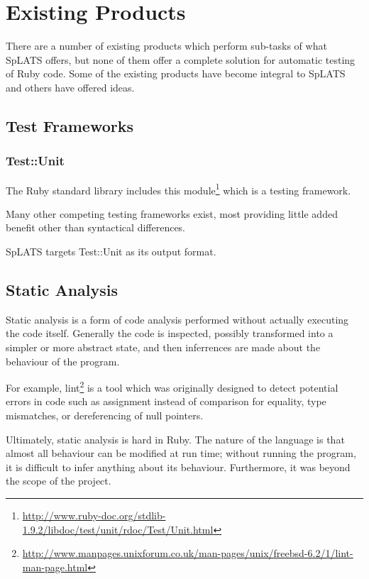 \chapter{Existing Products}

There are a number of existing products which perform sub-tasks of what SpLATS offers, but none of them offer a complete solution for automatic testing of Ruby code. Some of the existing products have become integral to SpLATS and others have offered ideas.

\section{Test Frameworks}

  \subsection{Test::Unit}
    The Ruby standard library includes this
module\footnote{\url{http://www.ruby-doc.org/stdlib-1.9.2/libdoc/test/unit/rdoc/Test/Unit.html}}
which is a testing framework.

Many other competing testing frameworks exist, most providing little added
benefit other than syntactical differences.

SpLATS targets Test::Unit as its output format.

\section{Static Analysis}

  Static analysis is a form of code analysis performed without actually
  executing the code itself. Generally the code is inspected, possibly
  transformed into a simpler or more abstract state, and then inferrences
  are made about the behaviour of the program.

  For example, lint\footnote{\url{http://www.manpages.unixforum.co.uk/man-pages/unix/freebsd-6.2/1/lint-man-page.html}}
  is a tool which was originally designed to detect potential errors in
  code such as assignment instead of comparison for equality, type mismatches,
  or dereferencing of null pointers.

  Ultimately, static analysis is hard in Ruby. The nature of the language is that
  almost all behaviour can be modified at run time; without running the program,
  it is difficult to infer anything about its behaviour. Furthermore, it was beyond
  the scope of the project.
  
